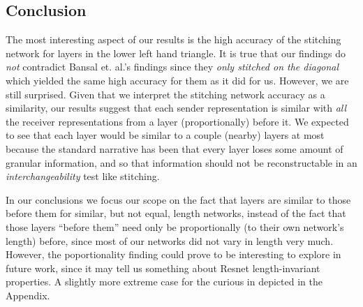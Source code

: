 \documentclass{article}
\begin{document}
\subsection{Conclusion}
The most interesting aspect of our results is the high accuracy of the stitching network
for layers in the lower left hand triangle. It is true that our findings do \textit{not} contradict Bansal et. al.'s
findings since they \textit{only stitched on the diagonal} which yielded the same high accuracy for them
as it did for us. However, we are still surprised. Given that we interpret the stitching network accuracy
as a similarity, our results suggest that each sender representation is similar with \textit{all}
the receiver representations from a layer (proportionally) before it. We expected to see that each layer would be
similar to a couple (nearby) layers at most because the standard narrative has been that 
every layer loses some amount of granular information, and so that information should not be reconstructable
in an \textit{interchangeability} test like stitching.

In our conclusions we focus our scope on the fact that layers are similar to those before them for similar, but not 
equal, length networks, 
instead of the fact that those layers ``before them'' need only be proportionally (to their own network's length) before, 
since most of our networks did not vary in length very much.
However, the poportionality finding could prove to be interesting to explore in future work, since it may tell us something
about Resnet length-invariant properties. A slightly more extreme case for the curious in depicted in the Appendix.
\end{document}
